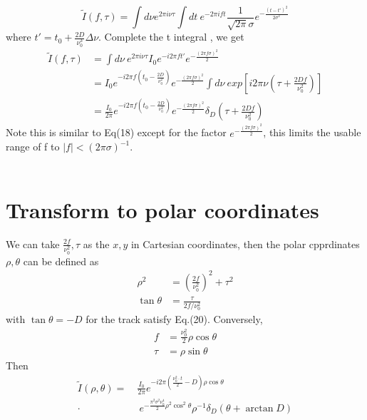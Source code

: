 \documentclass[twocolumn]{aastex61}
\begin{document}
\begin{equation}
\widetilde{I}(f,\tau) = \int d\nu e^{2\pi i \nu \tau}\int dt~e^{-2\pi ift} \frac{1}{\sqrt{2\pi}\sigma}e^{-\frac{(t-t')^2}{2\sigma ^2}}
\end{equation}
where $t'=t_0 + \frac{2D}{\nu _0 ^3}\Delta \nu$. Complete the t integral , we get
\begin{equation}
\begin{aligned}
\widetilde{I}(f,\tau)  & = \int d\nu~ e^{2\pi i\nu \tau}I_0  e^{-i2\pi ft'}e^{-\frac{(2\pi f\sigma)^2}{2}} \\
&= I_0e^{-i2\pi f(t_0 - \frac{2D}{\nu _0 ^2})}e^{-\frac{(2\pi f\sigma)^2}{2}}\int d\nu~exp[i2\pi\nu(\tau + \frac{2Df}{\nu ^2_0})] \\
&= \frac{I_0}{2\pi}e^{-i2\pi f(t_0-\frac{2D}{\nu ^2 _0})}e^{-\frac{(2\pi f\sigma)^2}{2}}\delta _D (\tau + \frac{2Df}{\nu ^2 _0})
\end{aligned}
\end{equation}
Note this is similar to Eq(18) except for the factor $e^{-\frac{(2\pi f \sigma)^2}{2}}$, this limits the usable range of f to $|f|<(2\pi\sigma)^{-1}$.
\\ \\

\section{Transform to polar coordinates}
\label{sec:discussion}
We can take $\frac{2f}{\nu _0 ^2},\tau$ as the $x,y$ in Cartesian coordinates, then the polar cpprdinates $\rho,\theta$ can be defined as 
\begin{equation}
\begin{aligned}
\rho ^2 &= \left(\frac{2f}{\nu _0 ^2}\right) ^2 + \tau ^2 \\
\tan\theta &= \frac{\tau}{2f/\nu ^2 _0} 
\end{aligned}
\end{equation}
with $\tan \theta = -D$ for the track satisfy Eq.(20). Conversely, 
\begin{equation}
\begin{aligned}
f &= \frac{\nu ^2 _0}{2}\rho \cos\theta \\
\tau &= \rho \sin \theta
\end{aligned}
\end{equation}
Then 
\begin{equation}
\begin{aligned}
\widetilde{I}(\rho, \theta) = ~&\frac{I_0}{2\pi}e^{-i2\pi\left(\frac{\nu ^2 _0\cdot t}{2}-D \right)\rho\cos\theta}~\\ 
\cdot & ~e^{-\frac{\pi^2\sigma ^2 \nu _0 ^4}{2}\rho ^2 \cos ^2 \theta}\rho ^{-1} \delta _D (\theta + \arctan D)
\end{aligned}
\end{equation}
\end{document}
